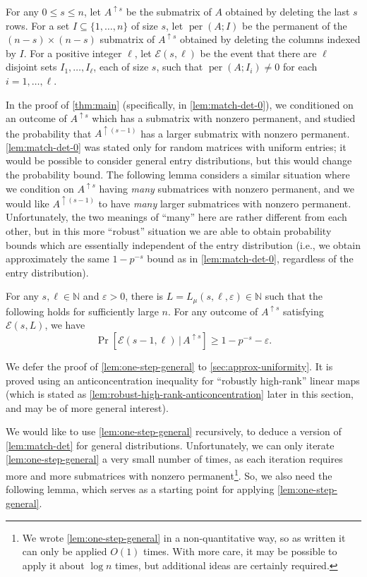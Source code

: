 \documentclass[10pt,reqno]{amsart}
\numberwithin{equation}{section}
\theoremstyle{remark}
\newcommand{\mb}{\mathbb}
\newcommand{\mc}{\mathcal}
\newcommand{\on}{\operatorname}
\begin{document}
\begin{definition}\label{def:per-submatrix}
For any $0\le s\le n$, let $A^{\uparrow s}$ be the submatrix of $A$ obtained by deleting the last $s$ rows. For a set $I\subseteq \{1,\dots,n\}$ of size $s$, let $\on{per}(A;I)$ be the permanent of the $(n-s)\times (n-s)$ submatrix of $A^{\uparrow s}$ obtained by deleting the columns indexed by $I$. For a positive integer $\ell$, let $\mc E(s,\ell)$ be the event that there are $\ell$ disjoint sets $I_1,\dots,I_\ell$, each of size $s$, such that $\on{per}(A;I_i)\ne 0$ for each $i=1,\dots,\ell$.
\end{definition}

In the proof of \cref{thm:main} (specifically, in \cref{lem:match-det-0}), we conditioned on an outcome of $A^{\uparrow s}$ which has a submatrix with nonzero permanent, and studied the probability that $A^{\uparrow {(s-1)}}$ has a larger submatrix with nonzero permanent. \cref{lem:match-det-0} was stated only for random matrices with uniform entries; it would be possible to consider general entry distributions, but this would change the probability bound. The following lemma considers a similar situation where we condition on $A^{\uparrow s}$ having \emph{many} submatrices with nonzero permanent, and we would like $A^{\uparrow  (s-1)}$ to have \emph{many} larger submatrices with nonzero permanent. Unfortunately, the two meanings of ``many'' here are rather different from each other, but in this more ``robust'' situation we are able to obtain probability bounds which are essentially independent of the entry distribution (i.e., we obtain approximately the same $1-p^{-s}$ bound as in \cref{lem:match-det-0}, regardless of the entry distribution).

\begin{lemma}\label{lem:one-step-general}
    For any $s,\ell\in \mb N$ and $\varepsilon>0$, there is $L=L_\mu(s,\ell,\varepsilon)\in \mb N$ such that the following holds for sufficiently large $n$. For any outcome of $A^{\uparrow s}$ satisfying $\mc E(s,L)$, we have
    \[\Pr[\mc E(s-1,\ell)\,|\,A^{\uparrow s}]\ge 1-p^{-s}-\varepsilon.\]
\end{lemma}
We defer the proof of \cref{lem:one-step-general} to \cref{sec:approx-uniformity}. It is proved using an anticoncentration inequality for ``robustly high-rank'' linear maps (which is stated as \cref{lem:robust-high-rank-anticoncentration} later in this section, and may be of more general interest).

We would like to use \cref{lem:one-step-general} recursively, to deduce a version of \cref{lem:match-det} for general distributions. Unfortunately, we can only iterate \cref{lem:one-step-general} a very small number of times, as each iteration requires more and more submatrices with nonzero permanent\footnote{We wrote \cref{lem:one-step-general} in a non-quantitative way, so as written it can only be applied $O(1)$ times. With more care, it may be possible to apply it about $\log n$ times, but additional ideas are certainly required.}. So, we also need the following lemma, which serves as a starting point for applying \cref{lem:one-step-general}.
\end{document}

